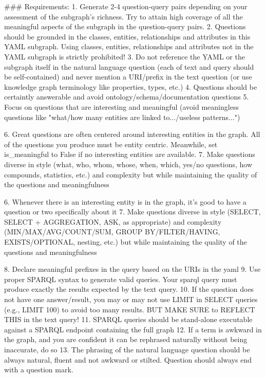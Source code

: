 \begin{tcblisting}
{{{{### Requirements:
1. Generate 2-4 question-query pairs depending on your assessment of the subgraph's richness. Try to attain high coverage of all the meaningful aspects of the subgraph in the question-query pairs.
2. Questions should be grounded in the classes, entities, relationships and attributes in this YAML subgraph. Using classes, entities, relationships and attributes not in the YAML subgraph is strictly prohibited!
3. Do not reference the YAML or the subgraph itself in the natural language question (each of text and query should be self-contained) and never mention a URI/prefix in the text question (or use knowledge graph terminology like properties, types, etc.)
4. Questions should be certaintly answerable and avoid ontology/schema/documentation questions
5. Focus on questions that are interesting and meaningful (avoid meaningless questions like "what/how many entities are linked to.../useless patterns...")
{%
6. Great questions are often centered around interesting entities in the graph. All of the questions you produce must be entity centric.
Meanwhile, set is_meaningful to False if no interesting entities are available.
7. Make questions diverse in style (what, who, whom, whose, when, which, yes/no questions, how compounds, statistics, etc.) and complexity but while maintaining the quality of the questions and meaningfulness
{%
6. Whenever there is an interesting entity is in the graph, it's good to have a question or two specifically about it
7. Make questions diverse in style (SELECT, SELECT + AGGREGATION, ASK, as appropriate) and complexity (MIN/MAX/AVG/COUNT/SUM, GROUP BY/FILTER/HAVING, EXISTS/OPTIONAL, nesting, etc.) but while maintaining the quality of the questions and meaningfulness
{%
8. Declare meaningful prefixes in the query based on the URIs in the yaml
9. Use proper SPARQL syntax to generate valid queries. Your sparql query must produce exactly the results expected by the text query.
10. If the question does not have one answer/result, you may or may not use LIMIT in SELECT queries (e.g., LIMIT 100) to avoid too many results. BUT MAKE SURE to REFLECT THIS in the text query!
11. SPARQL queries should be stand-alone executable against a SPARQL endpoint containing the full graph
12. If a term is awkward in the graph, and you are confident it can be rephrased naturally without being inaccurate, do so
13. The phrasing of the natural language question should be always natural, fluent and not awkward or stilted. Question should always end with a question mark.

}}}}}}}
\end{tcblisting}
